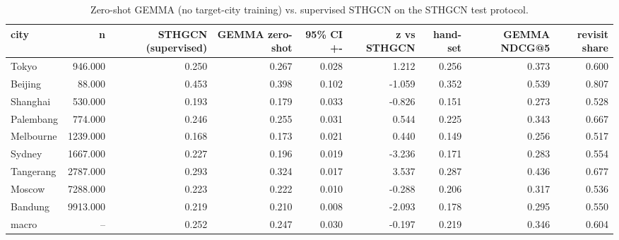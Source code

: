 \begin{table}[t]
\centering\small
\caption{Zero-shot GEMMA (no target-city training) vs. supervised STHGCN on the STHGCN test protocol.}
\label{tab:A7_main_zero_shot}
\begin{tabular}{lrrrrrrrr}
\toprule
city & n & STHGCN (supervised) & GEMMA zero-shot & 95\% CI +- & z vs STHGCN & hand-set & GEMMA NDCG@5 & revisit share \\
\midrule
Tokyo & 946.000 & 0.250 & 0.267 & 0.028 & 1.212 & 0.256 & 0.373 & 0.600 \\
Beijing & 88.000 & 0.453 & 0.398 & 0.102 & -1.059 & 0.352 & 0.539 & 0.807 \\
Shanghai & 530.000 & 0.193 & 0.179 & 0.033 & -0.826 & 0.151 & 0.273 & 0.528 \\
Palembang & 774.000 & 0.246 & 0.255 & 0.031 & 0.544 & 0.225 & 0.343 & 0.667 \\
Melbourne & 1239.000 & 0.168 & 0.173 & 0.021 & 0.440 & 0.149 & 0.256 & 0.517 \\
Sydney & 1667.000 & 0.227 & 0.196 & 0.019 & -3.236 & 0.171 & 0.283 & 0.554 \\
Tangerang & 2787.000 & 0.293 & 0.324 & 0.017 & 3.537 & 0.287 & 0.436 & 0.677 \\
Moscow & 7288.000 & 0.223 & 0.222 & 0.010 & -0.288 & 0.206 & 0.317 & 0.536 \\
Bandung & 9913.000 & 0.219 & 0.210 & 0.008 & -2.093 & 0.178 & 0.295 & 0.550 \\
macro & -- & 0.252 & 0.247 & 0.030 & -0.197 & 0.219 & 0.346 & 0.604 \\
\bottomrule
\end{tabular}
\end{table}
